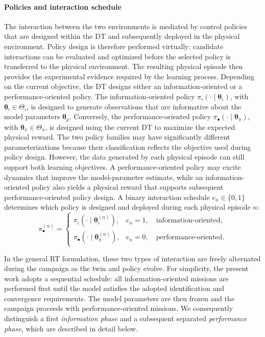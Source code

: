 \documentclass[journal]{IEEEtran}
\begin{document}
\paragraph*{Policies and interaction schedule}
The interaction between the two environments is mediated by control policies that are designed within the DT and subsequently deployed in the physical environment. Policy design is therefore performed virtually: candidate interactions can be evaluated and optimized before the selected policy is transferred to the physical environment. The resulting physical episode then provides the experimental evidence required by the learning process. Depending on the current objective, the DT designs either an information-oriented or a performance-oriented policy. The information-oriented policy $\pi_{\iota}(\cdot\mid\boldsymbol{\theta}_{\iota})$, with $\boldsymbol{\theta}_{\iota}\in\Theta_{\iota}$, is designed to generate observations that are informative about the model parameters $\boldsymbol{\theta}_{p}$. Conversely, the performance-oriented policy $\pi_{\bullet}(\cdot\mid\boldsymbol{\theta}_{\pi})$, with $\boldsymbol{\theta}_{\pi}\in\Theta_{\pi}$, is designed using the current DT to maximize the expected physical reward. The two policy families may have significantly different parameterizations because their classification reflects the objective used during policy design. However, the data generated by each physical episode can still support both learning objectives. A performance-oriented policy may excite dynamics that improve the model-parameter estimate, while an information-oriented policy also yields a physical reward that supports subsequent performance-oriented policy design.
A binary interaction schedule $e_n\in\{0,1\}$ determines which policy is designed and deployed during each physical episode $n$:
\begin{equation}
\pi_{\bullet}^{(n)}=
\begin{cases}
\pi_{\iota}\!\left(\cdot\mid\boldsymbol{\theta}_{\iota}^{(n)}\right),
& e_n=1,\quad \text{information-oriented},\\[2mm]
\pi_{\bullet}\!\left(\cdot\mid\boldsymbol{\theta}_{\pi}^{(n)}\right),
& e_n=0,\quad \text{performance-oriented}.
\end{cases}
\label{eq:rt-policy-schedule}\end{equation}

In the general RT formulation, these two types of interaction are freely alternated during the campaign as the twin and policy evolve. For simplicity, the present work adopts a sequential schedule: all information-oriented missions are performed first until the  model satisfies the adopted identification and convergence requirements. The model parameters are then frozen and the campaign proceeds with performance-oriented missions. We consequently distinguish a first \emph{information phase} and a subsequent separated \emph{performance phase}, which are described in detail below.
\end{document}
